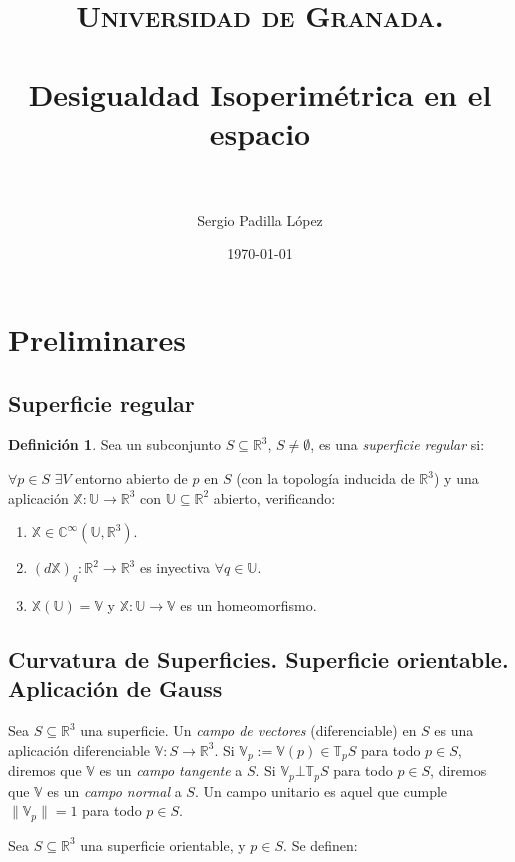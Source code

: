 \documentclass[paper=a4, fontsize=11pt, spanish]{scrartcl}
\title{
  \normalfont \normalsize
  \textsc{Universidad de Granada.} \\ [25pt]
  \horrule{0.5pt} \\[0.4cm]
  \huge Desigualdad Isoperimétrica en el espacio \\
  \horrule{2pt} \\[0.5cm]
}
\author{Sergio Padilla López}
\date{\normalsize\today}
\newcommand{\rdos}{\mathbb{R}^2}
\newcommand{\rtres}{\mathbb{R}^3}
\newcommand{\rdostortres}{\rdos \longrightarrow \rtres}
\newcommand{\umath}{\mathds{U}}
\newcommand{\vmath}{\mathds{V}}
\newcommand{\tmath}{\mathds{T}}
\newcommand{\utortres}{\umath \longrightarrow \rtres}
\newcommand{\utov}{\umath \longrightarrow \vmath}
\newcommand{\xmath}{\mathds{X}}
\newcommand{\cinf}{\mathds{C}^\infty}
\newcommand{\dxq}{(d\mathds{X})_{q}}
\theoremstyle{definition}
\theoremstyle{definition}
\newtheorem{definition}{Definición}
\theoremstyle{definition}
\begin{document}
\maketitle
\newpage

\tableofcontents

\newpage

\section{Preliminares}

\subsection{Superficie regular}

\begin{definition}
Sea un subconjunto $S \subseteq \rtres$, $S \neq \emptyset$, es una \textit{superficie regular} si:

$\forall p \in S$ $\exists V$ entorno abierto de $p$ en $S$ (con la topología inducida de $\rtres$) y una aplicación $\xmath: \utortres$ con $\umath \subseteq \rdos$ abierto, verificando:

\begin{enumerate}
    \item $\xmath \in \cinf(\umath, \rtres)$.
    \item $\dxq: \rdostortres$ es inyectiva $\forall q \in \umath$.
    \item $\xmath(\umath) = \vmath$ y $\xmath:\utov$ es un homeomorfismo.
\end{enumerate}
\end{definition}

\subsection{Curvatura de Superficies. Superficie orientable. Aplicación de Gauss}

Sea $S \subseteq \rtres$ una superficie. Un \textit{campo de vectores} (diferenciable) en $S$ es una aplicación diferenciable $\vmath: S \longrightarrow \rtres$. Si $\vmath_p := \vmath(p) \in \tmath_p S$ para todo $p \in S$, diremos que $\vmath$ es un \textit{campo tangente} a $S$. Si $\vmath_p \bot \tmath_p S$ para todo $p \in S$, diremos que $\vmath$ es un \textit{campo normal} a $S$. Un campo unitario es aquel que cumple $\parallel \vmath_p \parallel = 1$ para todo $p \in S$.

Sea $S \subseteq \rtres$ una superficie orientable, y $p \in S$. Se definen:
\end{document}

